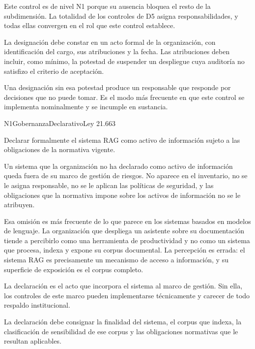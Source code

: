 Este control es de nivel N1 porque su ausencia bloquea el resto de la subdimensión. La totalidad de los controles de D5 asigna responsabilidades, y todas ellas convergen en el rol que este control establece.

La designación debe constar en un acto formal de la organización, con identificación del cargo, sus atribuciones y la fecha. Las atribuciones deben incluir, como mínimo, la potestad de suspender un despliegue cuya auditoría no satisfizo el criterio de aceptación.

Una designación sin esa potestad produce un responsable que responde por decisiones que no puede tomar. Es el modo más frecuente en que este control se implementa nominalmente y se incumple en sustancia.


  {N1}{Gobernanza}{Declarativo}{Ley 21.663}

Declarar formalmente el sistema RAG como activo de información sujeto a las obligaciones de la normativa vigente.

Un sistema que la organización no ha declarado como activo de información queda fuera de su marco de gestión de riesgos. No aparece en el inventario, no se le asigna responsable, no se le aplican las políticas de seguridad, y las obligaciones que la normativa impone sobre los activos de información no se le atribuyen.

Esa omisión es más frecuente de lo que parece en los sistemas basados en modelos de lenguaje. La organización que despliega un asistente sobre su documentación tiende a percibirlo como una herramienta de productividad y no como un sistema que procesa, indexa y expone su corpus documental. La percepción es errada: el sistema RAG es precisamente un mecanismo de acceso a información, y su superficie de exposición es el corpus completo.

La declaración es el acto que incorpora el sistema al marco de gestión. Sin ella, los controles de este marco pueden implementarse técnicamente y carecer de todo respaldo institucional.

La declaración debe consignar la finalidad del sistema, el corpus que indexa, la clasificación de sensibilidad de ese corpus y las obligaciones normativas que le resultan aplicables.

